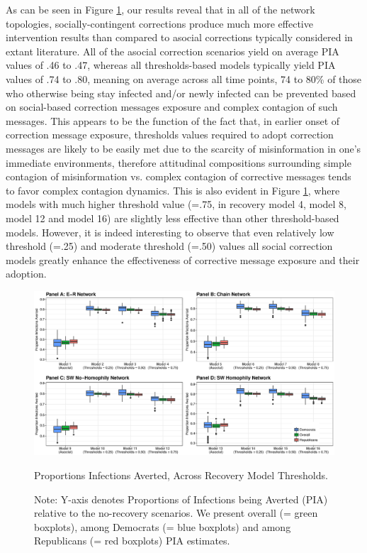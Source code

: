 \documentclass[man, 12pt, a4paper, nolmodern, noextraspace]{apa6}
\begin{document}
  As can be seen in Figure \ref{fig:Figure4}, our results reveal that in all of the network topologies, socially-contingent corrections  produce much more effective intervention results than compared to asocial corrections typically considered in extant literature. All of the asocial correction scenarios yield on average PIA values of .46 to .47, whereas all thresholds-based models typically yield PIA values of .74 to .80, meaning on average across all time points, 74 to 80\% of those who otherwise being stay infected and/or newly infected can be prevented based on social-based correction messages exposure and complex contagion of such messages. This appears to be the function of the fact that, in earlier onset of correction message exposure, thresholds values required to adopt correction messages are likely to be easily met due to the scarcity of misinformation in one's immediate environments, therefore attitudinal compositions surrounding simple contagion of misinformation vs. complex contagion of corrective messages tends to favor complex contagion dynamics. This is also evident in Figure \ref{fig:Figure4}, where models with much higher threshold value (=.75, in recovery model 4, model 8, model 12 and model 16) are slightly less effective than other threshold-based models. However, it is indeed interesting to observe that even relatively low threshold (=.25) and moderate threshold (=.50) values all social correction models greatly enhance the effectiveness of corrective message exposure and their adoption.  
  
\begin{figure}
    \centering
        \includegraphics[clip, width=\linewidth]{draft/Fig4.eps} 

    \captionsetup{format=hang}
    \caption{Proportions Infections Averted, Across Recovery Model Thresholds.} 
    \label{fig:Figure4}
    \captionsetup{font=small}
    \caption*{Note: Y-axis denotes Proportions of Infections being Averted (PIA) relative to the no-recovery scenarios. We present overall (= green boxplots), among Democrats (= blue boxplots) and among Republicans (= red boxplots) PIA estimates.} 
\end{figure}        
        
\end{document}
